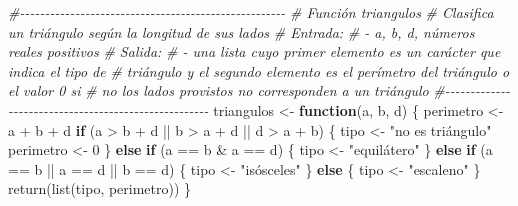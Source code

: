 \documentclass[
]{book}
\newenvironment{Shaded}{\begin{snugshade}}{\end{snugshade}}
\newcommand{\CommentTok}[1]{\textcolor[rgb]{0.56,0.35,0.01}{\textit{#1}}}
\newcommand{\ControlFlowTok}[1]{\textcolor[rgb]{0.13,0.29,0.53}{\textbf{#1}}}
\newcommand{\DecValTok}[1]{\textcolor[rgb]{0.00,0.00,0.81}{#1}}
\newcommand{\FunctionTok}[1]{\textcolor[rgb]{0.00,0.00,0.00}{#1}}
\newcommand{\NormalTok}[1]{#1}
\newcommand{\OtherTok}[1]{\textcolor[rgb]{0.56,0.35,0.01}{#1}}
\newcommand{\SpecialCharTok}[1]{\textcolor[rgb]{0.00,0.00,0.00}{#1}}
\newcommand{\StringTok}[1]{\textcolor[rgb]{0.31,0.60,0.02}{#1}}
\begin{document}
\begin{Shaded}
\begin{Highlighting}[]
\CommentTok{\#{-}{-}{-}{-}{-}{-}{-}{-}{-}{-}{-}{-}{-}{-}{-}{-}{-}{-}{-}{-}{-}{-}{-}{-}{-}{-}{-}{-}{-}{-}{-}{-}{-}{-}{-}{-}{-}{-}{-}{-}{-}{-}{-}{-}{-}{-}{-}{-}{-}{-}{-}{-}{-}}
\CommentTok{\# Función triangulos}
\CommentTok{\# Clasifica un triángulo según la longitud de sus lados}
\CommentTok{\# Entrada:}
\CommentTok{\#       {-} a, b, d, números reales positivos}
\CommentTok{\# Salida:}
\CommentTok{\#       {-} una lista cuyo primer elemento es un carácter que indica el tipo de}
\CommentTok{\#       triángulo y el segundo elemento es el perímetro del triángulo o el valor 0 si}
\CommentTok{\#       no los lados provistos no corresponden a un triángulo}
\CommentTok{\#{-}{-}{-}{-}{-}{-}{-}{-}{-}{-}{-}{-}{-}{-}{-}{-}{-}{-}{-}{-}{-}{-}{-}{-}{-}{-}{-}{-}{-}{-}{-}{-}{-}{-}{-}{-}{-}{-}{-}{-}{-}{-}{-}{-}{-}{-}{-}{-}{-}{-}{-}{-}{-}}
\NormalTok{triangulos }\OtherTok{\textless{}{-}} \ControlFlowTok{function}\NormalTok{(a, b, d) \{}
\NormalTok{    perimetro }\OtherTok{\textless{}{-}}\NormalTok{ a }\SpecialCharTok{+}\NormalTok{ b }\SpecialCharTok{+}\NormalTok{ d}
    \ControlFlowTok{if}\NormalTok{ (a }\SpecialCharTok{\textgreater{}}\NormalTok{ b }\SpecialCharTok{+}\NormalTok{ d }\SpecialCharTok{||}\NormalTok{ b }\SpecialCharTok{\textgreater{}}\NormalTok{ a }\SpecialCharTok{+}\NormalTok{ d }\SpecialCharTok{||}\NormalTok{ d }\SpecialCharTok{\textgreater{}}\NormalTok{ a }\SpecialCharTok{+}\NormalTok{ b) \{}
\NormalTok{        tipo }\OtherTok{\textless{}{-}} \StringTok{"no es triángulo"}
\NormalTok{        perimetro }\OtherTok{\textless{}{-}} \DecValTok{0}
\NormalTok{    \} }\ControlFlowTok{else} \ControlFlowTok{if}\NormalTok{ (a }\SpecialCharTok{==}\NormalTok{ b }\SpecialCharTok{\&}\NormalTok{ a }\SpecialCharTok{==}\NormalTok{ d) \{}
\NormalTok{        tipo }\OtherTok{\textless{}{-}} \StringTok{"equilátero"}
\NormalTok{    \} }\ControlFlowTok{else} \ControlFlowTok{if}\NormalTok{ (a }\SpecialCharTok{==}\NormalTok{ b }\SpecialCharTok{||}\NormalTok{ a }\SpecialCharTok{==}\NormalTok{ d }\SpecialCharTok{||}\NormalTok{ b }\SpecialCharTok{==}\NormalTok{ d) \{}
\NormalTok{        tipo }\OtherTok{\textless{}{-}} \StringTok{"isósceles"}
\NormalTok{    \} }\ControlFlowTok{else}\NormalTok{ \{}
\NormalTok{        tipo }\OtherTok{\textless{}{-}} \StringTok{"escaleno"}
\NormalTok{    \}}
    \FunctionTok{return}\NormalTok{(}\FunctionTok{list}\NormalTok{(tipo, perimetro))}
\NormalTok{\}}
\end{Highlighting}
\end{Shaded}
\end{document}
